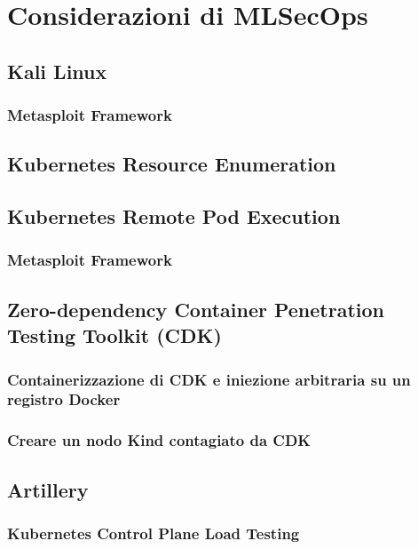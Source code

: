 % 
% 
% 



\clearpage
\cleardoublepage

\chapter{Considerazioni di MLSecOps}

\section{Kali Linux}

\subsection{Metasploit Framework}

\section{Kubernetes Resource Enumeration}

\section{Kubernetes Remote Pod Execution}

\subsection{Metasploit Framework}

\section{Zero-dependency Container Penetration Testing Toolkit (CDK)}

\subsection{Containerizzazione di CDK e iniezione arbitraria su un registro Docker}

\subsection{Creare un nodo Kind contagiato da CDK}

\section{Artillery}

\subsection{Kubernetes Control Plane Load Testing}